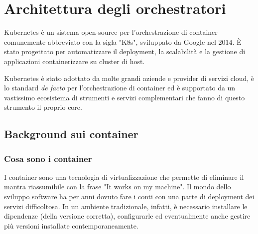 \documentclass[12pt, hidelinks]{report}
\begin{document}


\chapter{Architettura degli orchestratori}

Kubernetes è un sistema open-source per l'orchestrazione  di container comunemente abbreviato con la sigla "K8s", sviluppato da Google nel 2014. È stato progettato per automatizzare il deployment, la scalabilità e la gestione di applicazioni containerizzare su cluster di host.

Kubernetes è stato adottato da molte grandi aziende e provider di servizi cloud, è lo standard \textit{de facto} per l'orchestrazione di container ed è supportato da un vastissimo ecosistema di strumenti e servizi complementari che fanno di questo strumento il proprio core.

\section{Background sui container}
\subsection{Cosa sono i container}
I container sono una tecnologia di virtualizzazione che permette di eliminare il mantra riassumibile con la frase "It works on my machine".
Il mondo dello sviluppo software ha per anni dovuto fare i conti con una parte di deployment dei servizi difficoltosa. In un ambiente tradizionale, infatti, è necessario installare le dipendenze (della versione corretta), configurarle ed eventualmente anche gestire più versioni installate contemporaneamente.
\end{document}
